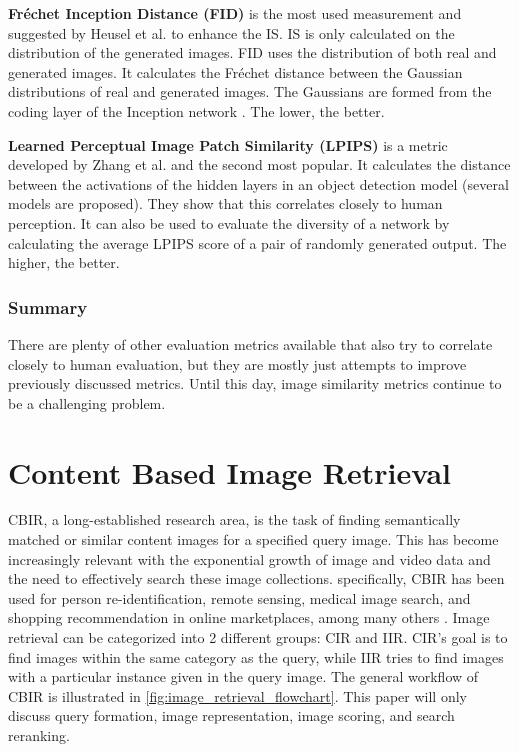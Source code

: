 \textbf{Fréchet Inception Distance (FID)} is the most used measurement and suggested by Heusel et al. \cite{Heusel2017} to enhance the \gls{IS}.
\gls{IS} is only calculated on the distribution of the generated images.
\gls{FID} uses the distribution of both real and generated images.
It calculates the Fréchet distance \cite{Frechet1957} between the Gaussian distributions of real and generated images.
The Gaussians are formed from the coding layer of the Inception network \cite{Szegedy2015}.
The lower, the better.

\textbf{Learned Perceptual Image Patch Similarity (LPIPS)} is a metric developed by Zhang et al. \cite{Zhang2018} and the second most popular.
It calculates the distance between the activations of the hidden layers in an object detection model (several models are proposed).
They show that this correlates closely to human perception.
It can also be used to evaluate the diversity of a network by calculating the average \gls{LPIPS} score of a pair of randomly generated output.
The higher, the better.

\subsubsection{Summary}
There are plenty of other evaluation metrics available that also try to correlate closely to human evaluation, but they are mostly just attempts to improve previously discussed metrics.
Until this day, image similarity metrics continue to be a challenging problem.

\section{Content Based Image Retrieval}
\gls{CBIR}, a long-established research area, is the task of finding semantically matched or similar content images for a specified query image.
This has become increasingly relevant with the exponential growth of image and video data and the need to effectively search these image collections.
specifically, \gls{CBIR} has been used for person re-identification, remote sensing, medical image search, and shopping recommendation in online marketplaces, among many others \cite{Chen2021}.
Image retrieval can be categorized into 2 different groups: \gls{CIR} and \gls{IIR}.
\gls{CIR}'s goal is to find images within the same category as the query, while \gls{IIR} tries to find images with a particular instance given in the query image.
The general workflow of \gls{CBIR} is illustrated in \ref{fig:image_retrieval_flowchart}.
This paper will only discuss query formation, image representation, image scoring, and search reranking.


